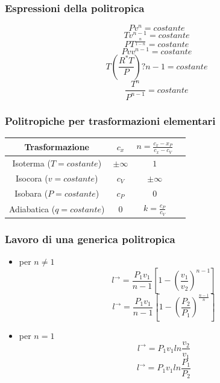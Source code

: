 \subsubsection{Espressioni della politropica}
\[
    Pv^n = costante
\]
\[
    Tv^{n-1} = costante
\]
\[
    PT^{\frac{n}{1-n}} = costante
\]
\[
    Pvv^{n-1} = costante
\]
\[
    T\left(\frac{R^*T}{P}\right)?{n-1}= costante
\]
\[
    \frac{T^n}{P^{n-1}} = costante
\]
\subsubsection{Politropiche per trasformazioni elementari}
\begin{center}
    \begin{tabular}{ |c|c|c|c| } 
    \hline
    Trasformazione & $c_x$ & $n = \frac{c_x - x_P}{c_x - c_V}$ \\
    \hline
    Isoterma ($T = costante$) & $\pm \infty$ & $1$ \\ 
    Isocora ($v = costante$) & $c_V$ & $\pm \infty$\\ 
    Isobara ($P = costante$) & $c_P$ & $0$\\ 
    Adiabatica ($q = costante$) & $0$ & $k= \frac{c_P}{c_V}$\\ 
    \hline
    \end{tabular}
    \end{center}
\subsubsection{Lavoro di una generica politropica}
\begin{itemize}
    \item per $n\neq 1$ 
    \[
        l^\rightarrow = \frac{P_1 v_1}{n-1}\left[1- \left(\frac{v_1}{v_2}\right)^{n-1}\right]
    \]
    \[
        l^\rightarrow = \frac{P_1 v_1}{n-1}\left[1- \left(\frac{P_2}{P_1}\right)^{\frac{n-1}{n}}\right]
    \]
    \item per $n = 1$
    \[
        l^\rightarrow = P_1v_1 ln \frac{v_2}{v_1}
    \]
    \[
        l^\rightarrow = P_1 v_1 ln \frac{P_1}{P_2}
    \]
\end{itemize}
